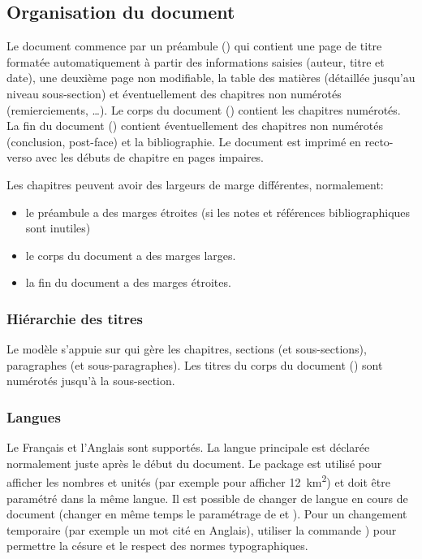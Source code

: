 \documentclass[
  a4paper, %
  11pt, extrafontsizes, %
  onecolumn, %
  openright, %
]{memoir}
\begin{document}
\subsection{Organisation du document}

Le document commence par un préambule () qui contient une page de titre formatée automatiquement à partir des informations saisies (auteur, titre et date), une deuxième page non modifiable, la table des matières (détaillée jusqu'au niveau sous-section) et éventuellement des chapitres non numérotés (remierciements, \dots). 
Le corps du document () contient les chapitres numérotés. 
La fin du document () contient éventuellement des chapitres non numérotés (conclusion, post-face) et la bibliographie. 
Le document est imprimé en recto-verso avec les débuts de chapitre en pages impaires.

Les chapitres peuvent avoir des largeurs de marge différentes, normalement:
\begin{itemize}
  \item le préambule a des marges étroites (si les notes et références bibliographiques sont inutiles)
  \item le corps du document a des marges larges.
  \item la fin du document a des marges étroites.
\end{itemize}

\subsubsection{Hiérarchie des titres}

Le modèle s'appuie sur  qui gère les chapitres, sections (et sous-sections), paragraphes (et sous-paragraphes). 
Les titres du corps du document () sont numérotés jusqu'à la sous-section.

\subsubsection{Langues}

Le Français et l'Anglais sont supportés. 
La langue principale est déclarée normalement juste après le début du document. 
Le package  est utilisé pour afficher les nombres et unités (par exemple  pour afficher \SI{12}{\kilo\meter\squared}) et doit être paramétré dans la même langue. 
Il est possible de changer de langue en cours de document (changer en même temps le paramétrage de  et ). 
Pour un changement temporaire (par exemple un mot cité en Anglais), utiliser la commande ) pour permettre la césure et le respect des normes typographiques.
\end{document}
